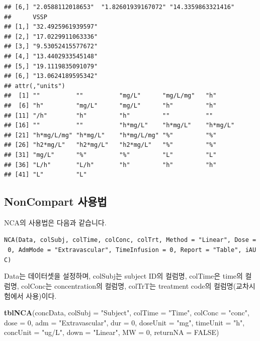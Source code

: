 \documentclass[]{krantz}
\makeatletter
\newenvironment{Shaded}{\begin{snugshade}}{\end{snugshade}}
\newcommand{\KeywordTok}[1]{\textcolor[rgb]{0.13,0.29,0.53}{\textbf{#1}}}
\newcommand{\DataTypeTok}[1]{\textcolor[rgb]{0.13,0.29,0.53}{#1}}
\newcommand{\DecValTok}[1]{\textcolor[rgb]{0.00,0.00,0.81}{#1}}
\newcommand{\StringTok}[1]{\textcolor[rgb]{0.31,0.60,0.02}{#1}}
\newcommand{\OtherTok}[1]{\textcolor[rgb]{0.56,0.35,0.01}{#1}}
\newcommand{\NormalTok}[1]{#1}
\newenvironment{kframe}{%
\medskip{}
\setlength{\fboxsep}{.8em}
 \def\at@end@of@kframe{}%
 \ifinner\ifhmode%
  \def\at@end@of@kframe{\end{minipage}}%
  \begin{minipage}{\columnwidth}%
 \fi\fi%
 \def\FrameCommand##1{\hskip\@totalleftmargin \hskip-\fboxsep
 \colorbox{shadecolor}{##1}\hskip-\fboxsep
     \hskip-\linewidth \hskip-\@totalleftmargin \hskip\columnwidth}%
 \MakeFramed {\advance\hsize-\width
   \@totalleftmargin\z@ \linewidth\hsize
   \@setminipage}}%
 {\par\unskip\endMakeFramed%
 \at@end@of@kframe}
\renewenvironment{Shaded}{\begin{kframe}}{\end{kframe}}
\theoremstyle{definition}
\theoremstyle{definition}
\theoremstyle{definition}
\theoremstyle{remark}
\makeatother
\begin{document}
\begin{verbatim}
## [6,] "2.0588112018653"  "1.82601939167072" "14.3359863321416"
##      VSSP              
## [1,] "32.4925961939597"
## [2,] "17.0229911063336"
## [3,] "9.53052415577672"
## [4,] "13.4402933545148"
## [5,] "19.1119835091079"
## [6,] "13.0624189595342"
## attr(,"units")
##  [1] ""          ""          "mg/L"      "mg/L/mg"   "h"        
##  [6] "h"         "mg/L"      "mg/L"      "h"         "h"        
## [11] "/h"        "h"         "h"         ""          ""         
## [16] ""          ""          "h*mg/L"    "h*mg/L"    "h*mg/L"   
## [21] "h*mg/L/mg" "h*mg/L"    "h*mg/L/mg" "%"         "%"        
## [26] "h2*mg/L"   "h2*mg/L"   "h2*mg/L"   "%"         "%"        
## [31] "mg/L"      "%"         "%"         "L"         "L"        
## [36] "L/h"       "L/h"       "h"         "h"         "h"        
## [41] "L"         "L"
\end{verbatim}

\subsection{NonCompart 사용법}\label{noncompart-}

NCA의 사용법은 다음과 같습니다.

\texttt{NCA(Data,\ colSubj,\ colTime,\ colConc,\ colTrt,\ Method\ =\ "Linear",\ Dose\ =\ 0,\ AdmMode\ =\ "Extravascular",\ TimeInfusion\ =\ 0,\ Report\ =\ "Table",\ iAUC)}

Data는 데이터셋을 설정하며, colSubj는 subject ID의 컬럼명, colTime은
time의 컬럼명, colConc는 concentration의 컬럼명, colTrT는 treatment
code의 컬럼명(교차시험에서 사용)이다.

\begin{Shaded}
\begin{Highlighting}[]
\KeywordTok{tblNCA}\NormalTok{(concData, }\DataTypeTok{colSubj =} \StringTok{"Subject"}\NormalTok{, }\DataTypeTok{colTime =} \StringTok{"Time"}\NormalTok{, }\DataTypeTok{colConc =} \StringTok{"conc"}\NormalTok{, }\DataTypeTok{dose =} \DecValTok{0}\NormalTok{, }
       \DataTypeTok{adm =} \StringTok{"Extravascular"}\NormalTok{, }\DataTypeTok{dur =} \DecValTok{0}\NormalTok{, }\DataTypeTok{doseUnit =} \StringTok{"mg"}\NormalTok{, }\DataTypeTok{timeUnit =} \StringTok{"h"}\NormalTok{, }
       \DataTypeTok{concUnit =} \StringTok{"ug/L"}\NormalTok{, }\DataTypeTok{down =} \StringTok{"Linear"}\NormalTok{, }\DataTypeTok{MW =} \DecValTok{0}\NormalTok{, }\DataTypeTok{returnNA =} \OtherTok{FALSE}\NormalTok{)}
\end{Highlighting}
\end{Shaded}
\end{document}

